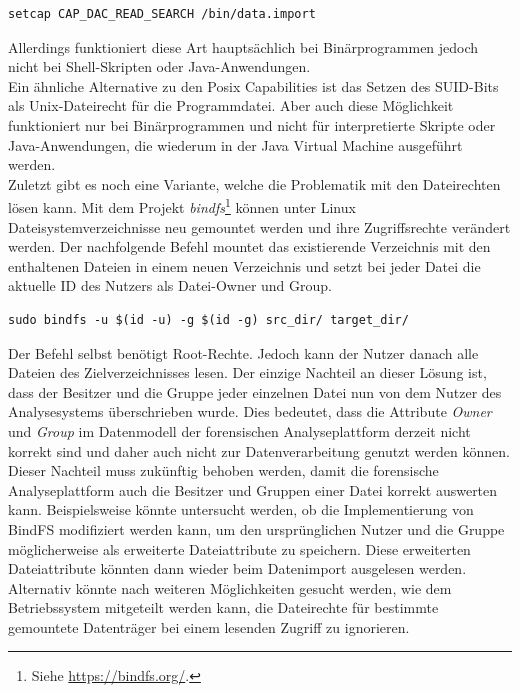 \begin{lstlisting}[label={lst:pos_cap_command},caption= Befehl zum Setzen von Posix Capabilities,captionpos=b,frame=single,style=customshell]
setcap CAP_DAC_READ_SEARCH /bin/data.import
\end{lstlisting}

\noindent
Allerdings funktioniert diese Art hauptsächlich bei Binärprogrammen jedoch nicht bei Shell-Skripten oder Java-Anwendungen.\\
Ein ähnliche Alternative zu den Posix Capabilities ist das Setzen des SUID-Bits als Unix-Dateirecht für die Programmdatei. Aber auch diese Möglichkeit funktioniert nur bei Binärprogrammen und nicht für interpretierte Skripte oder Java-Anwendungen, die wiederum in der Java Virtual Machine ausgeführt werden.\\

\noindent
Zuletzt gibt es noch eine Variante, welche die Problematik mit den Dateirechten lösen kann. 
Mit dem Projekt \textit{bindfs}\footnote{Siehe \url{https://bindfs.org/}.} können unter Linux Dateisystemverzeichnisse neu gemountet werden und ihre Zugriffsrechte verändert werden. Der nachfolgende Befehl mountet das existierende Verzeichnis mit den enthaltenen Dateien in einem neuen Verzeichnis und setzt bei jeder Datei die aktuelle ID des Nutzers als Datei-Owner und Group. 
\begin{lstlisting}[label={lst:bindfs_command},caption= Nutzung von Bindfs zum Ändern von Dateirechten,captionpos=b,frame=single,style=customshell]
sudo bindfs -u $(id -u) -g $(id -g) src_dir/ target_dir/
\end{lstlisting}
Der Befehl selbst benötigt Root-Rechte. Jedoch kann der Nutzer danach alle Dateien des Zielverzeichnisses lesen. Der einzige Nachteil an dieser Lösung ist, dass der Besitzer und die Gruppe jeder einzelnen Datei nun von dem Nutzer des Analysesystems überschrieben wurde.
Dies bedeutet, dass die Attribute \textit{Owner} und \textit{Group} im Datenmodell der forensischen Analyseplattform derzeit nicht korrekt sind und daher auch nicht zur Datenverarbeitung genutzt werden können. Dieser Nachteil muss zukünftig behoben werden, damit die forensische Analyseplattform auch die Besitzer und Gruppen einer Datei korrekt auswerten kann.
Beispielsweise könnte untersucht werden, ob die Implementierung von BindFS modifiziert werden kann, um den ursprünglichen Nutzer und die Gruppe möglicherweise als erweiterte Dateiattribute zu speichern. Diese erweiterten Dateiattribute könnten dann wieder beim Datenimport ausgelesen werden.\\
Alternativ könnte nach weiteren Möglichkeiten gesucht werden, wie dem Betriebssystem
mitgeteilt werden kann, die Dateirechte für bestimmte gemountete Datenträger bei einem lesenden Zugriff zu ignorieren.

